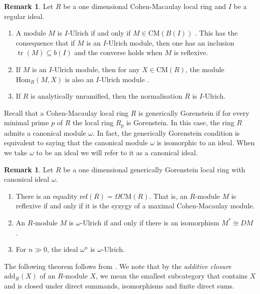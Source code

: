 \documentclass[12pt]{amsart}
\newcommand{\Hom}{\mathrm{Hom}}
\newcommand{\CM}{\mathrm{CM}}
\newcommand{\add}{\mathrm{add}}
\newcommand{\reflexive}{\mathrm{ref}}
\theoremstyle{definition}
\newtheorem{remark}[theorem]{Remark}
\DeclareMathOperator{\tr}{\mathrm{tr}}
\begin{document}
\begin{remark}\label{i-ulrich-modules}
    Let $R$ be a one dimensional Cohen-Macaulay local ring and $I$ be a regular ideal. 
    \begin{enumerate}
        \item A module $M$ is $I$-Ulrich if and only if $M \in \CM(B(I))$ \cite[Theorem 4.6]{Dao-Maitra-Sridhar}. This has the consequence that if $M$ is an $I$-Ulrich module, then one has an inclusion $\tr(M) \subseteq b(I)$ and the converse holds when $M$ is reflexive.
        \item If $M$ is an $I$-Ulrich module, then for any $X \in \CM(R)$, the module $\Hom_R(M,X)$ is also an $I$-Ulrich module \cite[Lemma 4.15]{Dao-Maitra-Sridhar}.
        \item If $R$ is analytically unramified, then the normalisation $\overline{R}$ is $I$-Ulrich.
    \end{enumerate}
\end{remark}
Recall that a Cohen-Macaulay local ring $R$ is generically Gorenstein if for every minimal prime $p$ of $R$ the local ring $R_p$ is Gorenstein. In this case, the ring $R$ admits a canonical module $\omega$. In fact, the generically Gorenstein condition is equivalent to saying that the canonical module $\omega$ is isomorphic to an ideal. When we take $\omega$ to be an ideal we will refer to it as a canonical ideal. 
\begin{remark}\label{omega-Ulrich-remarks}
    Let $R$ be a one dimensional generically Gorenstein local ring with canonical ideal $\omega$.
    \begin{enumerate}
        \item There is an equality $\reflexive(R) = \Omega \CM(R)$. That is, an $R$-module $M$ is reflexive if and only if it is the syzygy of a maximal Cohen-Macaulay module.
        \item An $R$-module $M$ is $\omega$-Ulrich if and only if there is an isomorphism $M^* \cong DM$ \cite[Corollary 4.27]{Dao-Maitra-Sridhar}.
        \item For $n \gg 0$, the ideal $\omega^n$ is $\omega$-Ulrich. 
    \end{enumerate}
\end{remark}
The following theorem follows from \cite[Theorem 5.5]{Dao-Dey-Dutta}. We note that by the \textit{additive closure} $\add_R(X)$ of an $R$-module $X$, we mean the smallest subcategory that contains $X$ and is closed under direct summands, isomorphisms and finite direct sums.  
\end{document}
